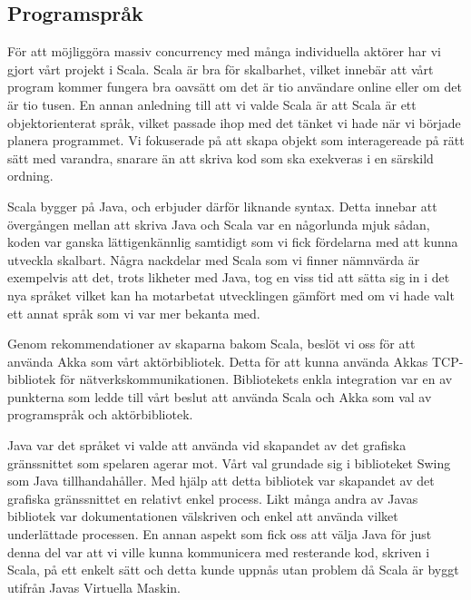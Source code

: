 \documentclass[a4paper]{article}
\begin{document}
\subsection{Programspråk}
För att möjliggöra massiv concurrency med många individuella aktörer har vi gjort vårt projekt i Scala. Scala är bra för skalbarhet, vilket innebär att vårt program kommer fungera bra oavsätt om det är tio användare online eller om det är tio tusen. En annan anledning till att vi valde Scala är att Scala är ett objektorienterat språk, vilket passade ihop med det tänket vi hade när vi började planera programmet. Vi fokuserade på att skapa objekt som interagereade på rätt sätt med varandra, snarare än att skriva kod som ska exekveras i en särskild ordning.

Scala bygger på Java, och erbjuder därför liknande syntax. Detta innebar att övergången mellan att skriva Java och Scala var en någorlunda mjuk sådan, koden var ganska lättigenkännlig samtidigt som vi fick fördelarna med att kunna utveckla skalbart. Några nackdelar med Scala som vi finner nämnvärda är exempelvis att det, trots likheter med Java, tog en viss tid att sätta sig in i det nya 
språket vilket kan ha motarbetat utvecklingen gämfört med om vi hade valt ett annat språk som vi var mer bekanta med.

Genom rekommendationer av skaparna bakom Scala, beslöt vi oss för att använda Akka som vårt aktörbibliotek. Detta för att kunna använda Akkas TCP-bibliotek för nätverkskommunikationen. Bibliotekets enkla integration var en av punkterna som ledde till vårt beslut att använda Scala och Akka som val av programspråk och aktörbibliotek.

Java var det språket vi valde att använda vid skapandet av det grafiska gränssnittet som spelaren agerar mot. Vårt val grundade sig i biblioteket Swing som Java tillhandahåller. 
Med hjälp att detta bibliotek var skapandet av det grafiska gränssnittet en relativt enkel process. Likt många andra av Javas bibliotek var dokumentationen välskriven och enkel 
att använda vilket underlättade processen. En annan aspekt som fick oss att välja Java för just denna del var att vi ville kunna kommunicera med resterande kod, skriven i Scala, 
på ett enkelt sätt och detta kunde uppnås utan problem då Scala är byggt utifrån Javas Virtuella Maskin. 
\end{document}
